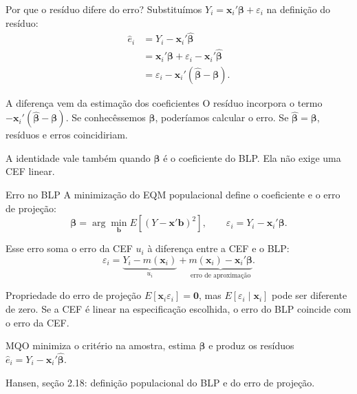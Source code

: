 \documentclass[
  ignorenonframetext,
  brazilian,
  aspectratio=169,
  10pt]{beamer}
\begin{document}
\begin{frame}{Por que o resíduo difere do erro?}
\protect{}\label{por-que-o-resuxedduo-difere-do-erro}
Substituímos \(Y_i=\mathbf x_i'\boldsymbol\beta+\varepsilon_i\) na
definição do resíduo: \[
\begin{aligned}
\hat e_i
&=Y_i-\mathbf x_i'\widehat{\boldsymbol\beta}\\
&=\mathbf x_i'\boldsymbol\beta+\varepsilon_i-\mathbf x_i'\widehat{\boldsymbol\beta}\\
&=\varepsilon_i-\mathbf x_i'(\widehat{\boldsymbol\beta}-\boldsymbol\beta).
\end{aligned}
\]

\begin{block}{A diferença vem da estimação dos coeficientes}
O resíduo incorpora o termo $-\mathbf x_i'(\widehat{\boldsymbol\beta}-\boldsymbol\beta)$.
Se conhecêssemos $\boldsymbol\beta$, poderíamos calcular o erro. Se $\widehat{\boldsymbol\beta}=\boldsymbol\beta$, resíduos e erros coincidiriam.
\end{block}

A identidade vale também quando \(\boldsymbol\beta\) é o coeficiente do
BLP. Ela não exige uma CEF linear.
\end{frame}

\begin{frame}{Erro no BLP}
\protect{}\label{erro-no-blp}
A minimização do EQM populacional define o coeficiente e o erro de
projeção: \[
\boldsymbol\beta=\arg\min_{\mathbf b}E[(Y-\mathbf x'\mathbf b)^2],
\qquad
\varepsilon_i=Y_i-\mathbf x_i'\boldsymbol\beta.
\]

Esse erro soma o erro da CEF \(u_i\) à diferença entre a CEF e o BLP: \[
\varepsilon_i=
\underbrace{Y_i-m(\mathbf x_i)}_{u_i}
+\underbrace{m(\mathbf x_i)-\mathbf x_i'\boldsymbol\beta}_{\text{erro de aproximação}}.
\]

\begin{block}{Propriedade do erro de projeção}
$E[\mathbf x_i\varepsilon_i]=\mathbf 0$, mas $E[\varepsilon_i\mid\mathbf x_i]$ pode ser diferente de zero. Se a CEF é linear na especificação escolhida, o erro do BLP coincide com o erro da CEF.
\end{block}

MQO minimiza o critério na amostra, estima \(\boldsymbol\beta\) e produz
os resíduos \(\hat e_i=Y_i-\mathbf x_i'\widehat{\boldsymbol\beta}\).

\scriptsize Hansen, seção 2.18: definição populacional do BLP e do erro
de projeção.
\end{frame}
\end{document}
